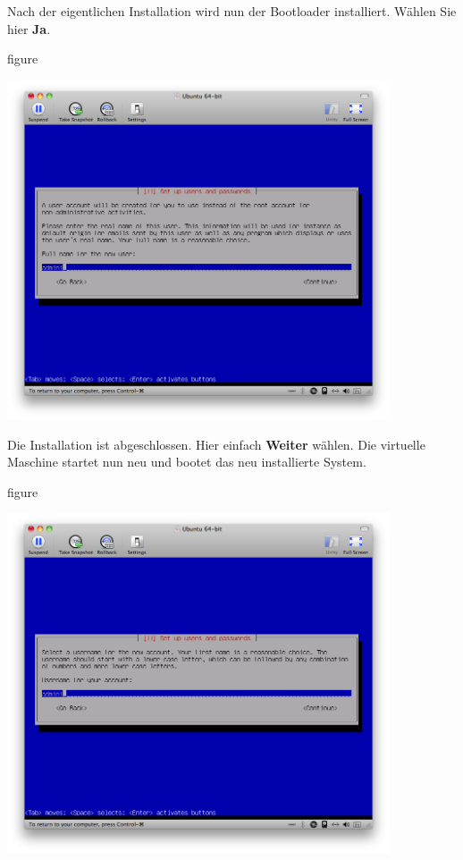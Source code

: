 Nach der eigentlichen Installation wird nun der Bootloader installiert. Wählen Sie hier \textbf{Ja}.

\begin{nofloat}{figure}
\begin{center}
\includegraphics[width=0.85\textwidth]{screenshots/28_ubuntu_install.png}
\end{center}
\end{nofloat}

\pagebreak
Die Installation ist abgeschlossen. Hier einfach \textbf{Weiter} wählen. Die virtuelle Maschine startet nun neu und
bootet das neu installierte System.

\begin{nofloat}{figure}
\begin{center}
\includegraphics[width=0.85\textwidth]{screenshots/29_ubuntu_install.png}
\end{center}
\end{nofloat}

